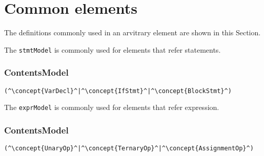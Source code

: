 \section{Common elements}
The definitions commonly used in an arvitrary element are shown in this Section.

The {\tt stmtModel} is commonly used for elements that refer statements.

\subsubsection*{ContentsModel}{}

\begin{lstlisting}[style=default]
(^\concept{VarDecl}^|^\concept{IfStmt}^|^\concept{BlockStmt}^)
\end{lstlisting}


The {\tt exprModel} is commonly used for elements that refer expression.

\subsubsection*{ContentsModel}{}

\begin{lstlisting}[style=default]
(^\concept{UnaryOp}^|^\concept{TernaryOp}^|^\concept{AssignmentOp}^)
\end{lstlisting}
